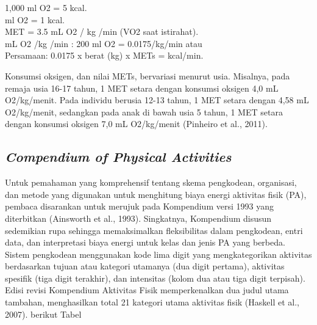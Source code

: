 1,000 ml O2 = 5 kcal. \\
 ml O2 = 1 kcal. \\
 MET = 3.5 mL O2 / kg /min (VO2 saat istirahat).  \\
 mL O2 /kg /min : 200 ml O2 = 0.0175/kg/min atau  \\
\indent Persamaan: 0.0175 x berat (kg) x METs = kcal/min.

Konsumsi oksigen, dan nilai METs, bervariasi menurut usia. Misalnya, pada remaja usia 16-17 tahun, 1 MET setara dengan konsumsi oksigen 4,0 mL O2/kg/menit. Pada individu berusia 12-13 tahun, 1 MET setara dengan 4,58 mL O2/kg/menit, sedangkan pada anak di bawah usia 5 tahun, 1 MET setara dengan konsumsi oksigen 7,0 mL O2/kg/menit (Pinheiro et al., 2011).

\subsection{\emph{Compendium of Physical Activities}}
\label{subsec:compendium}

Untuk pemahaman yang komprehensif tentang skema pengkodean, organisasi, dan metode yang digunakan untuk menghitung biaya energi aktivitas fisik (PA), pembaca disarankan untuk merujuk pada Kompendium versi 1993 yang diterbitkan (Ainsworth et al., 1993). Singkatnya, Kompendium disusun sedemikian rupa sehingga memaksimalkan fleksibilitas dalam pengkodean, entri data, dan interpretasi biaya energi untuk kelas dan jenis PA yang berbeda. Sistem pengkodean menggunakan kode lima digit yang mengkategorikan aktivitas berdasarkan tujuan atau kategori utamanya (dua digit pertama), aktivitas spesifik (tiga digit terakhir), dan intensitas (kolom dua atau tiga digit terpisah). Edisi revisi Kompendium Aktivitas Fisik memperkenalkan dua judul utama tambahan, menghasilkan total 21 kategori utama aktivitas fisik (Haskell et al., 2007). berikut Tabel

